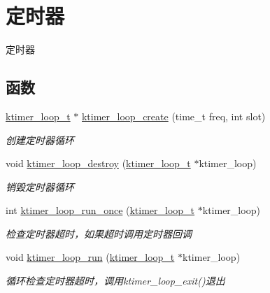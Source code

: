 \hypertarget{a00143}{}\section{定时器}
\label{a00143}


定时器  


\subsection*{函数}
\begin{DoxyCompactItemize}
\item 
\hyperlink{a00066_a024af2aa29615e7a811ea6c45438157d_a024af2aa29615e7a811ea6c45438157d}{ktimer\+\_\+loop\+\_\+t} $\ast$ \hyperlink{a00143_gaef96e7c368db456236a2121e3d75c49c_gaef96e7c368db456236a2121e3d75c49c}{ktimer\+\_\+loop\+\_\+create} (time\+\_\+t freq, int slot)
\begin{DoxyCompactList}\small\item\em 创建定时器循环 \end{DoxyCompactList}\item 
void \hyperlink{a00143_gad3dafe93f5b45424bd5983ef0c163687_gad3dafe93f5b45424bd5983ef0c163687}{ktimer\+\_\+loop\+\_\+destroy} (\hyperlink{a00066_a024af2aa29615e7a811ea6c45438157d_a024af2aa29615e7a811ea6c45438157d}{ktimer\+\_\+loop\+\_\+t} $\ast$ktimer\+\_\+loop)
\begin{DoxyCompactList}\small\item\em 销毁定时器循环 \end{DoxyCompactList}\item 
int \hyperlink{a00143_gaf195cf4006bced494e99242c36ad36c0_gaf195cf4006bced494e99242c36ad36c0}{ktimer\+\_\+loop\+\_\+run\+\_\+once} (\hyperlink{a00066_a024af2aa29615e7a811ea6c45438157d_a024af2aa29615e7a811ea6c45438157d}{ktimer\+\_\+loop\+\_\+t} $\ast$ktimer\+\_\+loop)
\begin{DoxyCompactList}\small\item\em 检查定时器超时，如果超时调用定时器回调 \end{DoxyCompactList}\item 
void \hyperlink{a00143_ga5e31b2fc26af005e97b09804c5a98099_ga5e31b2fc26af005e97b09804c5a98099}{ktimer\+\_\+loop\+\_\+run} (\hyperlink{a00066_a024af2aa29615e7a811ea6c45438157d_a024af2aa29615e7a811ea6c45438157d}{ktimer\+\_\+loop\+\_\+t} $\ast$ktimer\+\_\+loop)
\begin{DoxyCompactList}\small\item\em 循环检查定时器超时，调用ktimer\+\_\+loop\+\_\+exit()退出 \end{DoxyCompactList}\item 

\end{DoxyCompactItemize}
